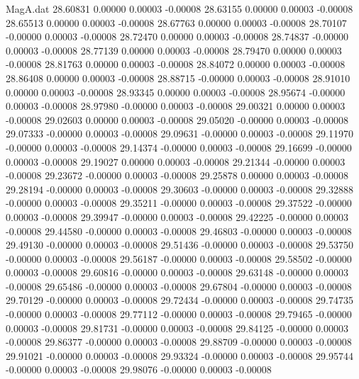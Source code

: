 \begin{filecontents}{MagA.dat}
  28.60831    0.00000    0.00003   -0.00008
  28.63155    0.00000    0.00003   -0.00008
  28.65513    0.00000    0.00003   -0.00008
  28.67763    0.00000    0.00003   -0.00008
  28.70107   -0.00000    0.00003   -0.00008
  28.72470    0.00000    0.00003   -0.00008
  28.74837   -0.00000    0.00003   -0.00008
  28.77139    0.00000    0.00003   -0.00008
  28.79470    0.00000    0.00003   -0.00008
  28.81763    0.00000    0.00003   -0.00008
  28.84072    0.00000    0.00003   -0.00008
  28.86408    0.00000    0.00003   -0.00008
  28.88715   -0.00000    0.00003   -0.00008
  28.91010    0.00000    0.00003   -0.00008
  28.93345    0.00000    0.00003   -0.00008
  28.95674   -0.00000    0.00003   -0.00008
  28.97980   -0.00000    0.00003   -0.00008
  29.00321    0.00000    0.00003   -0.00008
  29.02603    0.00000    0.00003   -0.00008
  29.05020   -0.00000    0.00003   -0.00008
  29.07333   -0.00000    0.00003   -0.00008
  29.09631   -0.00000    0.00003   -0.00008
  29.11970   -0.00000    0.00003   -0.00008
  29.14374   -0.00000    0.00003   -0.00008
  29.16699   -0.00000    0.00003   -0.00008
  29.19027    0.00000    0.00003   -0.00008
  29.21344   -0.00000    0.00003   -0.00008
  29.23672   -0.00000    0.00003   -0.00008
  29.25878    0.00000    0.00003   -0.00008
  29.28194   -0.00000    0.00003   -0.00008
  29.30603   -0.00000    0.00003   -0.00008
  29.32888   -0.00000    0.00003   -0.00008
  29.35211   -0.00000    0.00003   -0.00008
  29.37522   -0.00000    0.00003   -0.00008
  29.39947   -0.00000    0.00003   -0.00008
  29.42225   -0.00000    0.00003   -0.00008
  29.44580   -0.00000    0.00003   -0.00008
  29.46803   -0.00000    0.00003   -0.00008
  29.49130   -0.00000    0.00003   -0.00008
  29.51436   -0.00000    0.00003   -0.00008
  29.53750   -0.00000    0.00003   -0.00008
  29.56187   -0.00000    0.00003   -0.00008
  29.58502   -0.00000    0.00003   -0.00008
  29.60816   -0.00000    0.00003   -0.00008
  29.63148   -0.00000    0.00003   -0.00008
  29.65486   -0.00000    0.00003   -0.00008
  29.67804   -0.00000    0.00003   -0.00008
  29.70129   -0.00000    0.00003   -0.00008
  29.72434   -0.00000    0.00003   -0.00008
  29.74735   -0.00000    0.00003   -0.00008
  29.77112   -0.00000    0.00003   -0.00008
  29.79465   -0.00000    0.00003   -0.00008
  29.81731   -0.00000    0.00003   -0.00008
  29.84125   -0.00000    0.00003   -0.00008
  29.86377   -0.00000    0.00003   -0.00008
  29.88709   -0.00000    0.00003   -0.00008
  29.91021   -0.00000    0.00003   -0.00008
  29.93324   -0.00000    0.00003   -0.00008
  29.95744   -0.00000    0.00003   -0.00008
  29.98076   -0.00000    0.00003   -0.00008

\end{filecontents}

